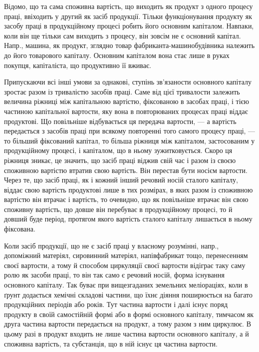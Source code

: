 Відомо, що та сама споживна вартість, що виходить як продукт з
одного процесу праці, ввіходить у другий як засіб продукції. Тільки
функціонування продукту як засобу праці в продукційному процесі робить
його основним капіталом. Навпаки, коли він ще тільки сам виходить
з процесу, він зовсім не є основний капітал. Напр., машина, як продукт,
зглядно товар фабриканта-машинобудівника належить до його
товарового капіталу. Основним капіталом вона стає лише в руках покупця,
капіталіста, що продуктивно її вживає.

Припускаючи всі інші умови за однакові, ступінь зв’язаности основного
капіталу зростає разом із тривалістю засобів праці. Саме від цієї
тривалости залежить величина ріжниці між капітальною вартістю, фіксованою
в засобах праці, і тією частиною капітальної вартости, яку вона
в повторюваних процесах праці віддає продуктові. Що повільніше відбувається
ця передача вартости, — а вартість передається з засобів праці
при всякому повторенні того самого процесу праці, — то більший фіксований
капітал, то більша ріжниця між капіталом, застосованим у продукційному
процесі, і капіталом, що в ньому зужитковується. Скоро ця
ріжниця зникає, це значить, що засіб праці віджив свій час і разом із
своєю споживною вартістю втратив свою вартість. Він перестав бути
носієм вартости. Через те, що засіб праці, як і кожний інший речовий
носій сталого капіталу, віддає свою вартість продуктові лише в тих розмірах,
в яких разом із споживною вартістю він втрачає і вартість, то
очевидно, що як повільніше втрачає він свою споживну вартість, що
довше він перебуває в продукційному процесі, то й довший буде період,
протягом якого вартість сталого капіталу лишається в ньому фіксована.

Коли засіб продукції, що не є засіб праці у власному розумінні,
напр., допоміжний матеріял, сировинний матеріял, напівфабрикат тощо,
перенесенням своєї вартости, а тому й способом циркуляції своєї вартости
відіграє таку саму ролю як засоби праці, то він так само є речовий
носій, форма існування основного капіталу. Так буває при вищезгаданих
земельних меліораціях, коли в ґрунт додається хемічні складові
частини, що їхнє діяння поширюється на багато продукційних періодів
або років. Тут частина вартости і далі існує поряд продукту в
своїй самостійній формі або в формі основного капіталу, тимчасом як друга
частина вартости передається на продукт, а тому разом з ним циркулює.
В цьому разі в продукт входить не лише частина вартости основного капіталу,
а й споживна вартість, та субстанція, що в ній існує ця частина вартости.

